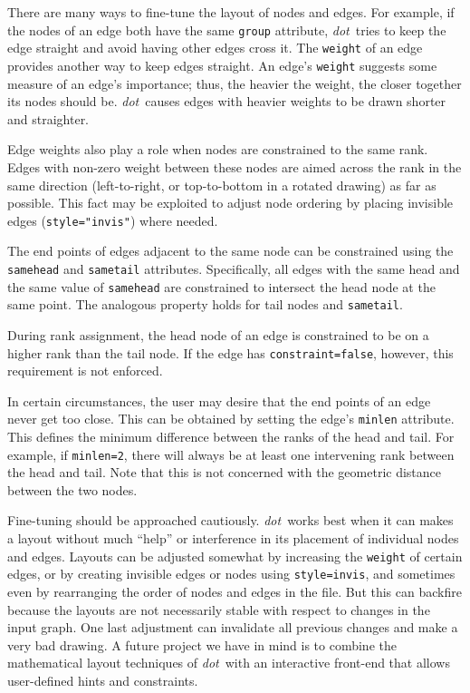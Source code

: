 \documentclass[11pt]{article}
\def\dot{{\it dot}}
\begin{document}
There are many ways to fine-tune the layout of nodes and edges. For
example, if the nodes of an edge both have the same {\tt group}
attribute, \dot\ tries to keep the edge straight and avoid
having other edges cross it.
The {\tt weight} of an edge provides another way to keep edges
straight. An edge's {\tt weight} suggests some measure of an edge's importance;
thus, the heavier the weight, the closer together its nodes should be.
\dot\ causes edges with heavier weights to be drawn shorter and straighter.

Edge weights also play a role when nodes are constrained to the same rank. 
Edges with non-zero weight between these nodes
are aimed across the rank in the same direction
(left-to-right, or top-to-bottom in a rotated drawing) as far as possible.
This fact may be exploited to adjust node ordering by placing 
invisible edges (\verb'style="invis"') where needed.

The end points of edges adjacent to the same node can be constrained
using the {\tt samehead} and {\tt sametail} attributes. Specifically,
all edges with the same head and the same value of {\tt samehead}
are constrained to intersect the head node at the same point. The
analogous property holds for tail nodes and {\tt sametail}.

During rank assignment, the head node of an edge is constrained to be 
on a higher rank than the tail node. If the edge has {\tt constraint=false},
however, this requirement is not enforced.

In certain circumstances, the user may desire that the end points of
an edge never get too close. This can be obtained by setting the
edge's {\tt minlen} attribute. This defines the minimum difference
between the ranks of the head and tail. For example, if {\tt minlen=2},
there will always be at least one intervening rank between the head and tail.
Note that this is not concerned with the geometric distance between the
two nodes.

Fine-tuning should be approached cautiously.  \dot\ works
best when it can makes a layout without much ``help'' or
interference in its placement of individual nodes and edges.
Layouts can be adjusted somewhat by increasing the \verb"weight" of
certain edges, or by creating invisible edges or nodes using \verb"style=invis",
and sometimes even by rearranging the order of nodes and edges in the file.
But this can backfire because the layouts are 
not necessarily stable with respect to changes in the input graph.
One last adjustment can invalidate all previous changes and make
a very bad drawing.  A future project we have in mind is to combine
the mathematical layout techniques of \dot\ with an interactive 
front-end that allows user-defined hints and constraints.
\end{document}
